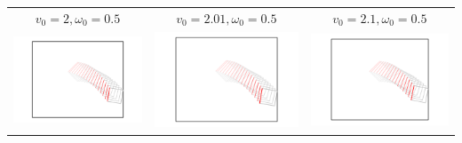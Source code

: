 \documentclass[11pt]{article}
\begin{document}
\newcommand{\tr}{\text{tr}}
\newcommand{\E}{\textbf{E}}
\newcommand{\diag}{\text{diag}}
\newcommand{\argmax}{\text{argmax}}
\newcommand{\argmin}{\text{argmin}}
\newcommand{\Cov}{\text{Cov}}
\newcommand{\Var}{\text{Var}}
\newcommand{\Vol}{\text{Vol}}
\newcommand{\HH}{\boldsymbol{H}}

\begin{center}
\begin{tabular}{ccc}
$v_0 = 2, \omega_0 = 0.5$ & $v_0 = 2.01, \omega_0 = 0.5$ & $v_0 = 2.1, \omega_0 = 0.5$\\
\includegraphics[scale = 0.26]{simA_01.pdf} & \includegraphics[scale = 0.26]{simB_01.pdf} & \includegraphics[scale = 0.26]{simC_01.pdf} \\

\end{tabular}
\end{center}
\end{document}
